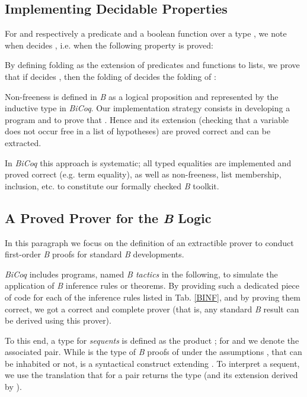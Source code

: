 \documentclass{llncs}
\begin{document}
\subsection{Implementing Decidable Properties}\label{ss_implem}

For  and  respectively a predicate and a boolean function over a type , we note
 when  decides , i.e. when the following property is proved:

By defining folding as the extension of predicates and functions to lists, we prove that if 
 decides , then the folding of   decides the folding of :


\begin{example}\small Non-freeness is defined in \emph{B} as a logical 
proposition and represented by the inductive type  in \emph{BiCoq}. Our 
implementation strategy consists in developing a program 
 and to prove that 
. Hence  
and its extension (checking that a variable does not occur free in a list of hypotheses) are 
proved correct and can be extracted.
\end{example}

In \emph{BiCoq} this approach is systematic; all typed equalities are implemented and proved 
correct (e.g. term equality), as well as non-freeness, list membership, inclusion, etc. to 
constitute our formally checked \emph{B} toolkit.

\subsection{A Proved Prover for the \emph{B} Logic}\label{ss_prov}

In this paragraph we focus on the definition of an extractible prover to conduct first-order 
\emph{B} proofs for standard \emph{B} developments.

\emph{BiCoq} includes programs, named \emph{B tactics} in the following, to simulate the 
application of \emph{B} inference rules or theorems. By providing such a dedicated piece of 
code for each of the inference rules listed in Tab. \ref{BINF}, and by proving them correct, 
we got a correct and complete prover (that is, any standard \emph{B} result can be derived 
using this prover). 

To this end, a type for \emph{sequents} is defined as the product ; 
for  and  we denote  the associated pair. While
 is the type of \emph{B} proofs of  under the assumptions , that can be 
inhabited or not,  is a syntactical construct extending . To interpret a 
sequent, we use the translation  that for a pair  returns 
the type  (and its extension derived by ).
\end{document}
